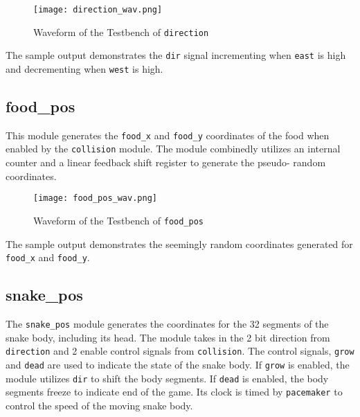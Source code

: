 \documentclass[paper=usletter, fontsize=12pt]{article}
\begin{document}
        \begin{figure}[ht]
            \begin{center}
                \texttt{[image: direction\_wav.png]}
                \caption{Waveform of the Testbench of \texttt{direction}}
                \label{fig:direction_wav}
            \end{center}
        \end{figure}

        The sample output demonstrates the \texttt{dir} signal incrementing
        when \texttt{east} is high and decrementing when \texttt{west} is high.

        \subsection{food\_pos} This module generates the \texttt{food\_x} and
        \texttt{food\_y} coordinates of the food when enabled by the
        \texttt{collision} module. The module combinedly utilizes an internal
        counter and a linear feedback shift register to generate the pseudo-
        random coordinates.

        \begin{figure}[ht]
            \begin{center}
                \texttt{[image: food\_pos\_wav.png]}
                \caption{Waveform of the Testbench of \texttt{food\_pos}}
                \label{fig:food_pos_wav}
            \end{center}
        \end{figure}

        The sample output demonstrates the seemingly random coordinates
        generated for \texttt{food\_x} and \texttt{food\_y}.

        \subsection{snake\_pos} The \texttt{snake\_pos} module generates the
        coordinates for the 32 segments of the snake body, including its head.
        The module takes in the 2 bit direction from \texttt{direction} and 2
        enable control signals from \texttt{collision}. The control signals,
        \texttt{grow} and \texttt{dead} are used to indicate the state of the
        snake body. If \texttt{grow} is enabled, the module utilizes
        \texttt{dir} to shift the body segments. If \texttt{dead} is enabled,
        the body segments freeze to indicate end of the game. Its clock is
        timed by \texttt{pacemaker} to control the speed of the moving snake
        body.
\end{document}

